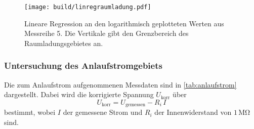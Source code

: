 \begin{figure}[H]
    \centering
    \texttt{[image: build/linregraumladung.pdf]}
    \caption{Lineare Regression an den logarithmisch geplotteten Werten aus Messreihe 5. Die Vertikale gibt den Grenzbereich des Raumladungsgebietes an.}
    \label{fig:linregkennl5}
\end{figure}


\subsubsection{Untersuchung des Anlaufstromgebiets}

Die zum Anlaufstrom aufgenommenen Messdaten sind in \autoref{tab:anlaufstrom} dargestellt.
Dabei wird die korrigierte Spannung $U_\text{korr}$ über
\begin{equation*}
    U_\text{korr} = U_\text{gemessen} - R_i \, I
\end{equation*} 
bestimmt, wobei $I$ der gemessene Strom und $R_i$ der Innenwiderstand von $1 \,\unit{\mega\ohm}$ sind.

